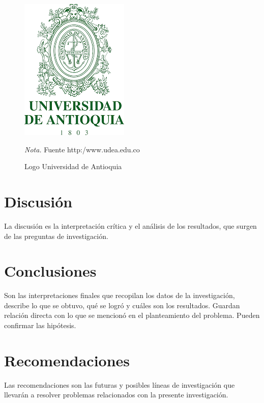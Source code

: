 \clearpage

\begin{figure}[!ht]
    \caption{Logo Universidad de Antioquia}
    \begin{center}
    \includegraphics{imagenes/escudo_udea_solo.png}\\
    \label{fig:escudo_udea}    
    \end{center}
    \textit{Nota.} Fuente http:/www.udea.edu.co
\end{figure}

\clearpage

\section{Discusión}

La discusión es la interpretación crítica y el análisis de los resultados, que surgen de las preguntas de investigación.


\newpage
\section{Conclusiones}

Son las interpretaciones finales que recopilan los datos de la investigación, describe lo que se obtuvo, qué se logró y cuáles son los resultados. Guardan relación directa con lo que se mencionó en el planteamiento del problema. Pueden confirmar las hipótesis. 


\newpage
\section{Recomendaciones}

Las recomendaciones son las futuras y posibles líneas de investigación que llevarán a resolver problemas relacionados con la presente investigación.



